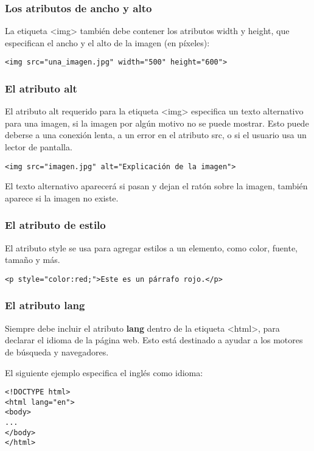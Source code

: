 \begin{frame}[fragile]
  \frametitle{Los atributos de ancho y alto}

  La etiqueta <img> también debe contener los atributos width y height,
  que especifican el ancho y el alto de la imagen (en píxeles):

  \vspace{\baselineskip}
  \begin{lstlisting}
<img src="una_imagen.jpg" width="500" height="600">
  \end{lstlisting}
\end{frame}

\begin{frame}[fragile]
  \frametitle{El atributo alt}

  El atributo alt requerido para la etiqueta <img> especifica un
  texto alternativo para una imagen, si la imagen por algún motivo no
  se puede mostrar. Esto puede deberse a una conexión lenta, a un error
  en el atributo src, o si el usuario usa un lector de pantalla.

  \vspace{\baselineskip}
  \begin{lstlisting}
<img src="imagen.jpg" alt="Explicación de la imagen">
  \end{lstlisting}

  \vspace{\baselineskip}
  El texto alternativo aparecerá si pasan y dejan el ratón sobre la imagen,
  también aparece si la imagen no existe.
\end{frame}

\begin{frame}[fragile]
  \frametitle{El atributo de estilo}

  El atributo style se usa para agregar estilos a un elemento,
  como color, fuente, tamaño y más.

  \vspace{\baselineskip}
  \begin{lstlisting}
<p style="color:red;">Este es un párrafo rojo.</p>
  \end{lstlisting}
\end{frame}

\begin{frame}[fragile]
  \frametitle{El atributo lang}

  Siempre debe incluir el atributo \textbf{lang} dentro de la
  etiqueta <html>, para declarar el idioma de la página web.
  Esto está destinado a ayudar a los motores de búsqueda y
  navegadores.

  El siguiente ejemplo especifica el inglés como idioma:

  \vspace{\baselineskip}
  \begin{lstlisting}
<!DOCTYPE html>
<html lang="en">
<body>
...
</body>
</html>
  \end{lstlisting}
\end{frame}


